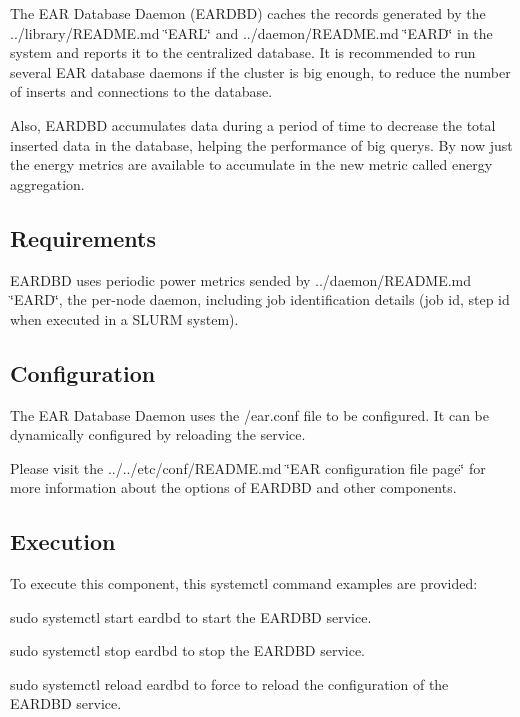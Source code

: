 The E\+AR Database Daemon (E\+A\+R\+D\+BD) caches the records generated by the ../library/\+R\+E\+A\+D\+ME.md \char`\"{}\+E\+A\+R\+L\char`\"{} and ../daemon/\+R\+E\+A\+D\+ME.md \char`\"{}\+E\+A\+R\+D\char`\"{} in the system and reports it to the centralized database. It is recommended to run several E\+AR database daemons if the cluster is big enough, to reduce the number of inserts and connections to the database.

Also, E\+A\+R\+D\+BD accumulates data during a period of time to decrease the total inserted data in the database, helping the performance of big querys. By now just the energy metrics are available to accumulate in the new metric called energy aggregation.

\subsection*{Requirements }

E\+A\+R\+D\+BD uses periodic power metrics sended by ../daemon/\+R\+E\+A\+D\+ME.md \char`\"{}\+E\+A\+R\+D\char`\"{}, the per-\/node daemon, including job identification details (job id, step id when executed in a S\+L\+U\+RM system).

\subsection*{Configuration }

The E\+AR Database Daemon uses the {\ttfamily /ear.conf} file to be configured. It can be dynamically configured by reloading the service.

Please visit the ../../etc/conf/\+R\+E\+A\+D\+ME.md \char`\"{}\+E\+A\+R configuration file page\char`\"{} for more information about the options of E\+A\+R\+D\+BD and other components.

\subsection*{Execution }

To execute this component, this {\ttfamily systemctl} command examples are provided\+:
\begin{DoxyItemize}
\item {\ttfamily sudo systemctl start eardbd} to start the E\+A\+R\+D\+BD service.
\item {\ttfamily sudo systemctl stop eardbd} to stop the E\+A\+R\+D\+BD service.
\item {\ttfamily sudo systemctl reload eardbd} to force to reload the configuration of the E\+A\+R\+D\+BD service. 
\end{DoxyItemize}